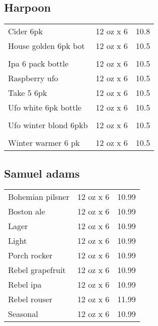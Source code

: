 \documentclass{article}%
\begin{document}
\begin{multicols}{3}
%
\subsection*{Harpoon}%
\begin{tabular}{l c r}%
Cider 6pk&12 oz x 6&10.8\\%
\multirow{1}{15ex}{House golden 6pk bot}&12 oz x 6&10.5\\%
&&\\%
Ipa 6 pack bottle&12 oz x 6&10.5\\%
Raspberry ufo&12 oz x 6&10.5\\%
Take 5 6pk&12 oz x 6&10.5\\%
\multirow{1}{15ex}{Ufo white 6pk bottle}&12 oz x 6&10.5\\%
&&\\%
\multirow{1}{15ex}{Ufo winter blond 6pkb}&12 oz x 6&10.5\\%
&&\\%
Winter warmer 6 pk&12 oz x 6&10.5\\%
\end{tabular}

%
\subsection*{Samuel adams}%
\begin{tabular}{l c r}%
Bohemian pilsner&12 oz x 6&10.99\\%
Boston ale&12 oz x 6&10.99\\%
Lager&12 oz x 6&10.99\\%
Light&12 oz x 6&10.99\\%
Porch rocker&12 oz x 6&10.99\\%
Rebel grapefruit&12 oz x 6&10.99\\%
Rebel ipa&12 oz x 6&10.99\\%
Rebel rouser&12 oz x 6&11.99\\%
Seasonal&12 oz x 6&10.99\\%
\end{tabular}

%
\end{multicols}%
\end{document}
